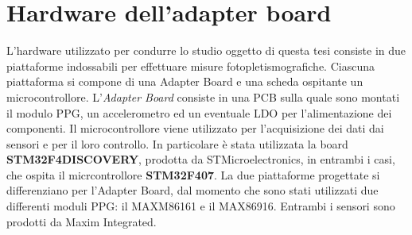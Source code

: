 \section{Hardware dell'adapter board}
L'hardware utilizzato per condurre lo studio oggetto di questa tesi consiste in due piattaforme indossabili per effettuare misure fotopletismografiche. Ciascuna piattaforma si compone di una Adapter Board e una scheda ospitante un microcontrollore. L'\textit{Adapter Board} consiste in una PCB sulla quale sono montati il modulo PPG, un accelerometro ed un eventuale LDO per l'alimentazione dei componenti. Il microcontrollore viene utilizzato per l'acquisizione dei dati dai sensori e per il loro controllo. In particolare è stata utilizzata la board \textbf{STM32F4DISCOVERY}, prodotta da STMicroelectronics, in entrambi i casi, che ospita il micrcontrollore \textbf{STM32F407}.
La due piattaforme progettate si differenziano per l'Adapter Board, dal momento che sono stati utilizzati due differenti moduli PPG: il MAXM86161 e il MAX86916. Entrambi i sensori sono prodotti da Maxim Integrated.
